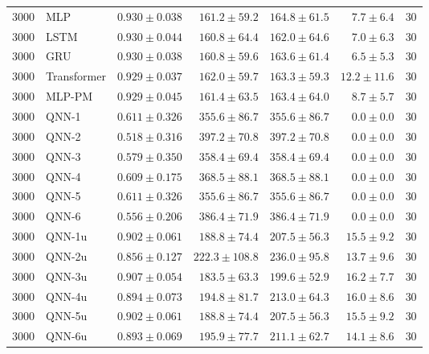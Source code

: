 \begin{longtable}{rlrrrrr}
3000 & MLP & $0.930 \pm 0.038$ & $161.2 \pm 59.2$ & $164.8 \pm 61.5$ & $7.7 \pm 6.4$ & 30 \\
3000 & LSTM & $0.930 \pm 0.044$ & $160.8 \pm 64.4$ & $162.0 \pm 64.6$ & $7.0 \pm 6.3$ & 30 \\
3000 & GRU & $0.930 \pm 0.038$ & $160.8 \pm 59.6$ & $163.6 \pm 61.4$ & $6.5 \pm 5.3$ & 30 \\
3000 & Transformer & $0.929 \pm 0.037$ & $162.0 \pm 59.7$ & $163.3 \pm 59.3$ & $12.2 \pm 11.6$ & 30 \\
3000 & MLP-PM & $0.929 \pm 0.045$ & $161.4 \pm 63.5$ & $163.4 \pm 64.0$ & $8.7 \pm 5.7$ & 30 \\
3000 & QNN-1 & $0.611 \pm 0.326$ & $355.6 \pm 86.7$ & $355.6 \pm 86.7$ & $0.0 \pm 0.0$ & 30 \\
3000 & QNN-2 & $0.518 \pm 0.316$ & $397.2 \pm 70.8$ & $397.2 \pm 70.8$ & $0.0 \pm 0.0$ & 30 \\
3000 & QNN-3 & $0.579 \pm 0.350$ & $358.4 \pm 69.4$ & $358.4 \pm 69.4$ & $0.0 \pm 0.0$ & 30 \\
3000 & QNN-4 & $0.609 \pm 0.175$ & $368.5 \pm 88.1$ & $368.5 \pm 88.1$ & $0.0 \pm 0.0$ & 30 \\
3000 & QNN-5 & $0.611 \pm 0.326$ & $355.6 \pm 86.7$ & $355.6 \pm 86.7$ & $0.0 \pm 0.0$ & 30 \\
3000 & QNN-6 & $0.556 \pm 0.206$ & $386.4 \pm 71.9$ & $386.4 \pm 71.9$ & $0.0 \pm 0.0$ & 30 \\
3000 & QNN-1u & $0.902 \pm 0.061$ & $188.8 \pm 74.4$ & $207.5 \pm 56.3$ & $15.5 \pm 9.2$ & 30 \\
3000 & QNN-2u & $0.856 \pm 0.127$ & $222.3 \pm 108.8$ & $236.0 \pm 95.8$ & $13.7 \pm 9.6$ & 30 \\
3000 & QNN-3u & $0.907 \pm 0.054$ & $183.5 \pm 63.3$ & $199.6 \pm 52.9$ & $16.2 \pm 7.7$ & 30 \\
3000 & QNN-4u & $0.894 \pm 0.073$ & $194.8 \pm 81.7$ & $213.0 \pm 64.3$ & $16.0 \pm 8.6$ & 30 \\
3000 & QNN-5u & $0.902 \pm 0.061$ & $188.8 \pm 74.4$ & $207.5 \pm 56.3$ & $15.5 \pm 9.2$ & 30 \\
3000 & QNN-6u & $0.893 \pm 0.069$ & $195.9 \pm 77.7$ & $211.1 \pm 62.7$ & $14.1 \pm 8.6$ & 30 \\
\end{longtable}
\par{}
